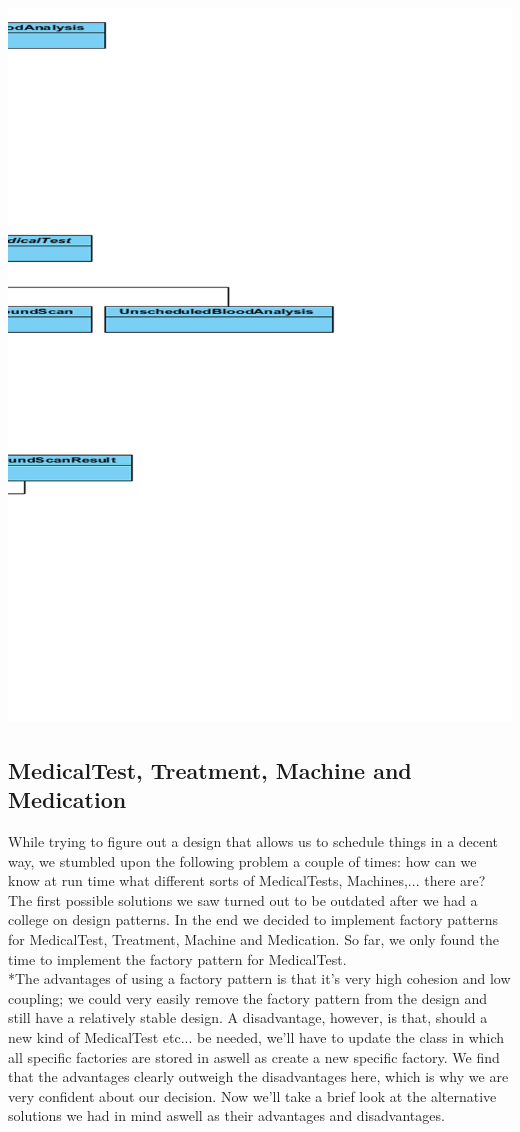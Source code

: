 \documentclass[11pt]{article}
\begin{document}
\includegraphics[width=170mm]{right.png}\\

\subsection{MedicalTest, Treatment, Machine and Medication}
While trying to figure out a design that allows us to schedule things in a decent way, we stumbled upon the following problem a couple of times: how can we know at run time what different sorts of MedicalTests, Machines,... there are? The first possible solutions we saw turned out to be outdated after we had a college on design patterns. In the end we decided to implement factory patterns for MedicalTest, Treatment, Machine and Medication. So far, we only found the time to implement the factory pattern for MedicalTest.
\\*The advantages of using a factory pattern is that it's very high cohesion and low coupling; we could very easily remove the factory pattern from the design and still have a relatively stable design. A disadvantage, however, is that, should a new kind of MedicalTest etc... be needed, we'll have to update the class in which all specific factories are stored in aswell as create a new specific factory. We find that the advantages clearly outweigh the disadvantages here, which is why we are very confident about our decision.
\newline Now we'll take a brief look at the alternative solutions we had in mind aswell as their advantages and disadvantages.
\end{document}

